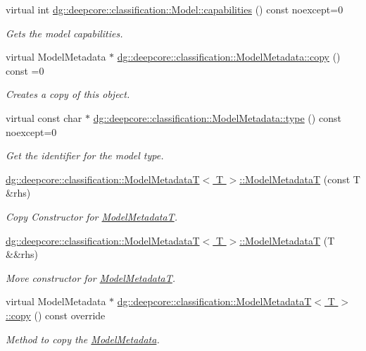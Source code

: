 \begin{DoxyCompactItemize}
virtual int \hyperlink{group___classification_module_ga1a7ca79fbb134c78c7e88df94cf8d374}{dg\+::deepcore\+::classification\+::\+Model\+::capabilities} () const noexcept=0
\begin{DoxyCompactList}\small\item\em Gets the model capabilities. \end{DoxyCompactList}\item 
virtual Model\+Metadata $\ast$ \hyperlink{group___classification_module_ga851d179b56e5c32b25512df0141f3ca2}{dg\+::deepcore\+::classification\+::\+Model\+Metadata\+::copy} () const =0
\begin{DoxyCompactList}\small\item\em Creates a copy of this object. \end{DoxyCompactList}\item 
virtual const char $\ast$ \hyperlink{group___classification_module_ga5d7ed12ccbf9bda3bd29b6d59648db76}{dg\+::deepcore\+::classification\+::\+Model\+Metadata\+::type} () const noexcept=0
\begin{DoxyCompactList}\small\item\em Get the identifier for the model type. \end{DoxyCompactList}\item 
\hyperlink{group___classification_module_ga52e88b4c63c2a8db9b06ce5b470be1c4}{dg\+::deepcore\+::classification\+::\+Model\+Metadata\+T$<$ T $>$\+::\+Model\+MetadataT} (const T \&rhs)
\begin{DoxyCompactList}\small\item\em Copy Constructor for \hyperlink{classdg_1_1deepcore_1_1classification_1_1_model_metadata_t}{Model\+MetadataT}. \end{DoxyCompactList}\item 
\hyperlink{group___classification_module_ga76d79f72f6223539cf9d8b9549cc8a2d}{dg\+::deepcore\+::classification\+::\+Model\+Metadata\+T$<$ T $>$\+::\+Model\+MetadataT} (T \&\&rhs)
\begin{DoxyCompactList}\small\item\em Move constructor for \hyperlink{classdg_1_1deepcore_1_1classification_1_1_model_metadata_t}{Model\+MetadataT}. \end{DoxyCompactList}\item 
virtual Model\+Metadata $\ast$ \hyperlink{group___classification_module_ga4f92b6936e50c4e47ca4ceaaac0466f5}{dg\+::deepcore\+::classification\+::\+Model\+Metadata\+T$<$ T $>$\+::copy} () const override
\begin{DoxyCompactList}\small\item\em Method to copy the \hyperlink{classdg_1_1deepcore_1_1classification_1_1_model_metadata}{Model\+Metadata}. \end{DoxyCompactList}\item 

\end{DoxyCompactItemize}
